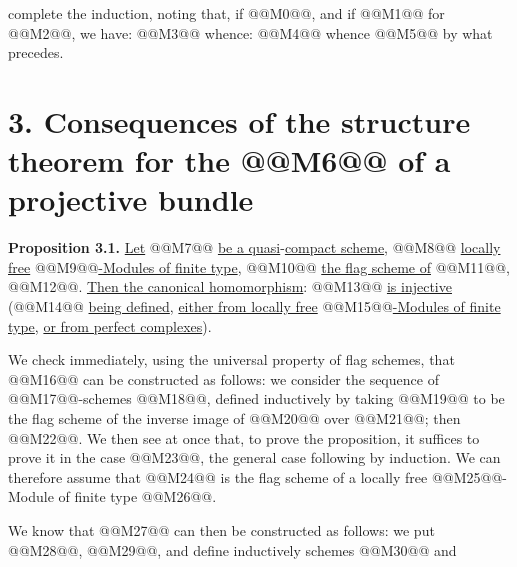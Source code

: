 \providecommand{\Sym}{\operatorname{Sym}}
\providecommand{\GL}{\operatorname{GL}}
\providecommand{\Grass}{\operatorname{Grass}}
\providecommand{\gr}{\operatorname{gr}}
\providecommand{\ctop}{c_{\mathrm{top}}}
\providecommand{\Rep}{\operatorname{Rep}}
\providecommand{\RZ}{R_{\mathbb Z}}
\providecommand{\Dflag}{D}
\providecommand{\Gmn}{G}
complete the induction, noting that, if @@M0@@, and if @@M1@@ for @@M2@@, we have:
@@M3@@
whence:
@@M4@@
whence @@M5@@ by what precedes.

\section*{3. Consequences of the structure theorem for the @@M6@@ of a projective bundle}

\textbf{Proposition 3.1.} \uline{Let} @@M7@@ \uline{be a quasi}-\uline{compact scheme}, @@M8@@ \uline{locally free} @@M9@@\uline{-Modules of finite type}, @@M10@@ \uline{the flag scheme of} @@M11@@, @@M12@@.
\uline{Then the canonical homomorphism}:
@@M13@@
\uline{is injective} (@@M14@@ \uline{being defined}, \uline{either from locally free} @@M15@@\uline{-Modules of finite type}, \uline{or from perfect complexes}).

We check immediately, using the universal property of flag schemes, that @@M16@@ can be constructed as follows: we consider the sequence of @@M17@@-schemes @@M18@@, defined inductively by taking @@M19@@ to be the flag scheme of the inverse image of @@M20@@ over @@M21@@; then @@M22@@. We then see at once that, to prove the proposition, it suffices to prove it in the case @@M23@@, the general case following by induction. We can therefore assume that @@M24@@ is the flag scheme of a locally free @@M25@@-Module of finite type @@M26@@.

We know that @@M27@@ can then be constructed as follows: we put @@M28@@, @@M29@@, and define inductively schemes @@M30@@ and
